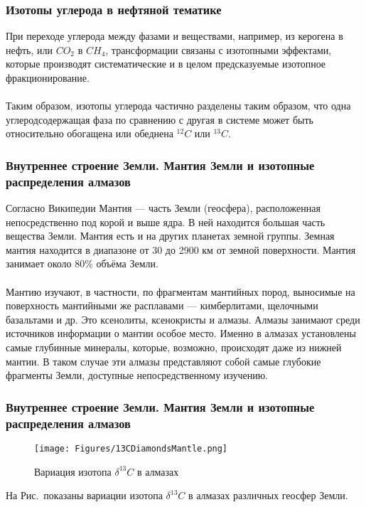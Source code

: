 \begin{frame}
\frametitle{Изотопы углерода в нефтяной тематике}


При переходе углерода между фазами и веществами, например, из керогена 
в нефть, или $CO_2$ в $CH_4$, трансформации связаны с изотопными
эффектами, которые производят систематические и в целом предсказуемые
изотопное фракционирование. \\
~\\
Таким образом, изотопы углерода частично
разделены таким образом, что одна углеродсодержащая фаза по сравнению с
другая в системе может быть относительно обогащена или обеднена
$^{12}C$ или $^{13}C$.

\end{frame}


\begin{frame}
\frametitle{Внутреннее строение Земли. Мантия Земли и изотопные распределения алмазов}



{\small

Согласно Википедии 
Мантия --- часть Земли (геосфера), расположенная непосредственно под корой и выше ядра. В ней находится большая часть вещества Земли. Мантия есть и на других планетах земной группы. Земная мантия находится в диапазоне от 30 до 2900 км от земной поверхности. Мантия занимает около 80\% объёма Земли.\\
~\\
Мантию изучают, в частности, по фрагментам мантийных пород, выносимые на поверхность мантийными же расплавами — кимберлитами, щелочными базальтами и др. Это ксенолиты, ксенокристы и алмазы. Алмазы занимают среди источников информации о мантии особое место. Именно в алмазах установлены самые глубинные минералы, которые, возможно, происходят даже из нижней мантии. В таком случае эти алмазы представляют собой самые глубокие фрагменты Земли, доступные непосредственному изучению.
}



\end{frame}

\begin{frame}
\frametitle{Внутреннее строение Земли. Мантия Земли и изотопные распределения алмазов}



\begin{figure}[h]
	\centering
	\texttt{[image: Figures/13CDiamondsMantle.png]}
	\caption{Вариация изотопа $\delta^{13}C$ в алмазах}
	\label{fig:13CDiamondsMantle}
\end{figure}

На Рис.~показаны вариации изотопа $\delta^{13}C$ в алмазах различных геосфер Земли.


\end{frame}

